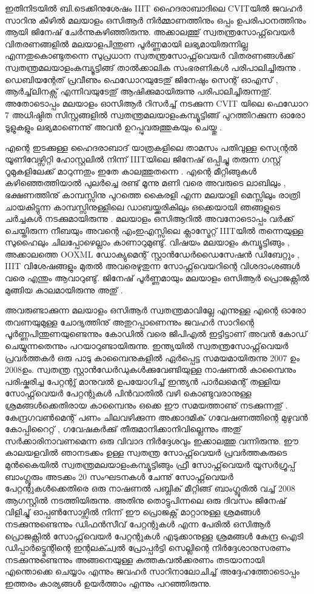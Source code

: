 ഇതിനിടയില്‍ ബി.ടെക്കിനുശേഷം IIIT ഹൈദരാബാദിലെ CVITയില്‍ ജവഹര്‍ സാറിനു കീഴില്‍ മലയാളം ഒസിആര്‍ നിര്‍മ്മാണത്തിനും ഒപ്പം ഉപരിപഠനത്തിനും ആയി ജിനേഷ് ചേര്‍ന്നുകഴിഞ്ഞിരുന്നു. അക്കാലത്തു് സ്വതന്ത്രസോഫ്റ്റ്‌വെയര്‍  വിതരണങ്ങളില്‍ മലയാളപിന്തുണ പൂര്‍ണ്ണമായി ലഭ്യമായിരുന്നില്ല എന്നതുകൊണ്ടുതന്നെ സുപ്രധാന സ്വതന്ത്രസോഫ്റ്റ്‌വെയര്‍ വിതരണങ്ങള്‍ക്ക് സ്വതന്ത്രമലയാളംകമ്പ്യൂട്ടിങ്ങ് താല്‍ക്കാലിക സംഭരണികള്‍ പരിപാലിച്ചിരുന്നു . ഡെബിയന്റേത് പ്രവീണും ഫെഡോറയുടേതു് ജിനേഷും സെന്റ് ഓഎസ് , ആര്‍ച്ച്‌ലിനക്സ് എന്നിവയുടേതു് ആഷിക്കുമായിരുന്നു പരിപാലിച്ചിരുന്നതു്. അതോടൊപ്പം മലയാളം ഓസിആര്‍ റിസര്‍ച്ച് നടക്കുന്ന CVIT യിലെ ഫെഡോറ 7 അധിഷ്ഠിത സിസ്റ്റങ്ങളില്‍ സ്വതന്ത്രമലയാളംകമ്പ്യൂട്ടിങ്ങ് പുറത്തിറക്കുന്ന ഓരോ ടൂളുകളും ലഭ്യമാണെന്നു് അവന്‍ ഉറപ്പുവരുത്തുകയും ചെയ്തു . 

എന്റെ ഇടക്കുള്ള ഹൈദരാബാദ് യാത്രകളിലെ താമസം പതിവുള്ള സെന്റ്രല്‍ യൂണിവേഴ്സിറ്റി ഹോസ്റ്റലില്‍ നിന്ന് IIITയിലെ ജിനേഷ് ഒപ്പിച്ചു തരുന്ന ഗസ്റ്റ് റൂമുകളിലേക്ക് മാറുന്നതും ഇതേ കാലത്തുതന്നെ . എന്റെ മീറ്റിങ്ങുകള്‍ കഴിഞ്ഞെത്തിയാല്‍ പുലര്‍ച്ചെ രണ്ട് മൂന്നു മണി വരെ അവരുടെ ലാബിലും , ഭക്ഷണത്തിനു് കാമ്പസ്സിനു പുറത്തെ കൈരളി എന്ന മലയാളി മെസ്സിലും  രാത്രി ചായകിട്ടുന്ന കാമ്പസ്സിനുള്ളിലെ ഡാബയ്ക്കരികിലും ഒക്കെയായി ഞങ്ങളുടെ ചര്‍ച്ചകള്‍ നടക്കുമായിരുന്നു . മലയാളം ഒസിആറില്‍ അവനോടൊപ്പം വര്‍ക്ക് ചെയ്തിരുന്ന നീബയും  അവന്റെ എംഇഎസ്സിലെ  ക്ലാസ്മേറ്റ് IIITയില്‍ തന്നെയുള്ള സുഹൈലും ചിലപ്പോഴെല്ലാം കാണാറുമുണ്ടു്. വിഷയം മലയാളം കമ്പ്യൂട്ടിങ്ങും , അക്കാലത്തെ OOXML ഡോക്യുമെന്റ് സ്റ്റാന്‍ഡേര്‍ഡൈസേഷന്‍ ഡിബേറ്റും , IIIT വിശേഷങ്ങളും മുതല്‍ അവരെഴുതുന്ന സോഫ്റ്റ്‌വെയറിന്റെ വിശദാംശങ്ങള്‍ വരെ എന്തും ആവാറുണ്ടു്. ജിനേഷ് പൂര്‍ണ്ണമായും മലയാളം ഒസിആര്‍ പ്രൊജക്റ്റില്‍ മുങ്ങിയ കാലമായിരുന്നു അതു് . 

അവരുണ്ടാക്കുന്ന മലയാളം ഒസിആര്‍ സ്വതന്ത്രമാവില്ലേ എന്നുള്ള എന്റെ ഓരോ തവണയുമുള്ള ചോദ്യത്തിനു് അതുറപ്പാണെന്നും ജവഹര്‍ സാറിന്റെ പൂര്‍ണ്ണപിന്തുണയുണ്ടെന്നും കോഡില്‍ വരെ ജിപിഎല്‍ ഇട്ടിട്ടാണ് അവന്‍ കോഡ് ചെയ്യുന്നതെന്നും പറയാറുണ്ടായിരുന്നു. ഇന്ത്യയില്‍ സ്വതന്ത്രസോഫ്റ്റ്‌വെയര്‍ പ്രവര്‍ത്തകര്‍ ഒരു പാടു കാമ്പൈനുകളില്‍ ഏര്‍പ്പെട്ട സമയമായിരുന്നു 2007 ഉം 2008ഉം. സ്വതന്ത്ര സ്റ്റാന്‍ഡേര്‍ഡുകള്‍ക്കുവേണ്ടിയുള്ള നാഷണല്‍ കാമ്പൈനും പരിഷ്കരിച്ച പേറ്റന്റു് മാനുവല്‍ ഉപയോഗിച്ച് ഇന്ത്യന്‍ പാര്‍ലമെന്റ് തള്ളിയ സോഫ്റ്റ്‌വെയര്‍ പേറ്റന്റുകള്‍ പിന്‍വാതില്‍ വഴി കൊണ്ടുവരാനുള്ള ശ്രമങ്ങള്‍ക്കെതിരായ കാമ്പൈനും  ഒക്കെ ഈ സമയത്താണു് നടക്കുന്നതു് . കേന്ദ്രഗവണ്‍മെന്റ് പണം ചിലവഴിക്കുന്ന അക്കാദമിക് ഗവേഷണത്തിന്റെ മുഴുവന്‍ കോപ്പിറൈറ്റ് , ഗവേഷകര്‍ക്കു് തീരുമാനിക്കാനിവില്ലെന്നും അതു് സര്‍ക്കാരിനാവണമെന്ന ഒരു വിവാദ നിര്‍ദ്ദേശവും ഇക്കാലത്തു  വന്നിരുന്നു. ഈ കാലയളവില്‍ ഞാനടക്കം ഉള്ള സ്വതന്ത്ര സോഫ്റ്റ്‌വെയര്‍ പ്രവര്‍ത്തകരുടെ മുന്‍കൈയില്‍ സ്വതന്ത്രമലയാളംകമ്പ്യൂട്ടിങ്ങും ഫ്രീ സോഫ്റ്റ്‌വെയര്‍ യൂസര്‍ഗ്രൂപ്പ് ബാംഗ്ലൂരും അടക്കം 20 സംഘടനകള്‍ ചേന്നു് സോഫ്റ്റ്‌വെയര്‍ പേറ്റന്റുകള്‍ക്കെതിരെ  ഒരു നാഷണല്‍ പബ്ലിക് മീറ്റിങ്ങ്  ബാംഗ്ലൂരില്‍ വച്ച് 2008 ആഗസ്റ്റില്‍ നടത്തിയിരുന്നു. അതിനു തൊട്ടുപിന്നലെ ഒരു ദിവസം ജിനേഷ് വിളിച്ചു് ഓപ്പണ്‍സോഴ്സില്‍ നിന്ന് ഈ പ്രൊജക്റ്റ് മാറ്റാനുള്ള ശ്രമങ്ങള്‍ നടക്കുന്നുണ്ടെന്നും ഡിഫന്‍സീവ് പേറ്റന്റുകള്‍ എന്ന പേരില്‍ ഒസിആര്‍ പ്രൊജക്റ്റില്‍ സോഫ്റ്റ്‌വെയര്‍ പേറ്റന്റുകള്‍ എടുക്കാനുള്ള ശ്രമങ്ങള്‍  കേന്ദ്ര ഐടി ഡിപ്പാര്‍ട്ട്മെന്റിന്റെ ഇന്റലക്ച്വല്‍ പ്രോപ്പര്‍ട്ടി സെല്ലിന്റെ നിര്‍ദ്ദേശാനുസരണം നടക്കുന്നുണ്ടെന്നും അങ്ങനെയുള്ള കുത്തകവല്‍ക്കരണം തടയാനായി എന്തൊക്കെ ചെയ്യാം എന്നും ജവഹര്‍ സാറിനാലോചിച്ച് അദ്ദേഹത്തോടൊപ്പം ഇത്തരം കാര്യങ്ങള്‍ ഉയര്‍ത്താം എന്നും പറഞ്ഞിരുന്നു. 

